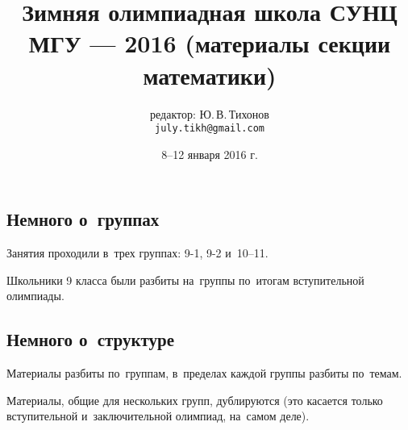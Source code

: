 


\begingroup
\providecommand\ifsourcelinks{\iffalse}
\providecommand\url[1]{\texttt{#1}}
\providecommand\href[2]{#2}

\title{%
    Зимняя олимпиадная школа СУНЦ МГУ --- 2016
    (материалы секции математики)}
\author{%
    редактор: Ю.\,В.\,Тихонов \\
    \texttt{\href{mailto:july.tikh@gmail.com}{july.tikh@gmail.com}}}
\date{8--12 января 2016 г.}

\maketitle

\subsection*{Немного о~группах}

Занятия проходили в~трех группах: 9-1, 9-2 и~10--11.

Школьники 9 класса были разбиты на~группы по~итогам вступительной олимпиады.

\subsection*{Немного о~структуре}

Материалы разбиты по~группам, в~пределах каждой группы разбиты по~темам.

Материалы, общие для нескольких групп, дублируются (это касается только
вступительной и~заключительной олимпиад, на~самом деле).
\ifsourcelinks
Все материалы сопровождаются ссылками на~исходные файлы \LaTeX.
\fi

\endgroup %

